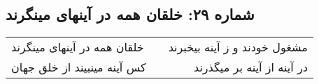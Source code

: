 \begin{center}
\section*{شماره ۲۹: خلقان همه در آینهای مینگرند}
\label{sec:029}
\begin{longtable}{l p{0.5cm} r}
خلقان همه در آینهای مینگرند
&&
مشغول خودند و ز آینه بیخبرند
\\
کس آینه مینبیند از خلق جهان
&&
در آینه از آینه بر میگذرند
\\
\end{longtable}
\end{center}
